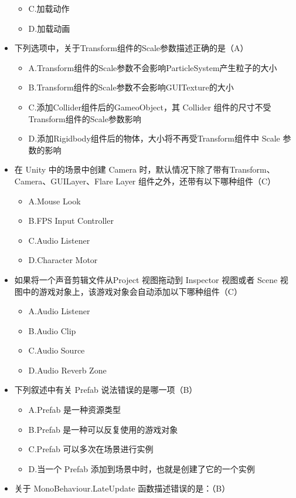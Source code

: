\documentclass[9pt, b5paper]{article}
\begin{document}
\begin{itemize}
\begin{itemize}
\item C.加载动作
\item D.加载动画
\end{itemize}
\item 下列选项中，关于Transform组件的Scale参数描述正确的是（A）
\begin{itemize}
\item A.Transform组件的Scale参数不会影响ParticleSystem产生粒子的大小
\item B.Transform组件的Scale参数不会影响GUITexture的大小
\item C.添加Collider组件后的GameoObject，其 Collider 组件的尺寸不受Transform组件的Scale参数影响
\item D.添加Rigidbody组件后的物体，大小将不再受Transform组件中 Scale 参数的影响
\end{itemize}
\item 在 Unity 中的场景中创建 Camera 时，默认情况下除了带有Transform、Camera、GUILayer、Flare Layer 组件之外，还带有以下哪种组件（C）
\begin{itemize}
\item A.Mouse Look
\item B.FPS Input Controller
\item C.Audio Listener
\item D.Character Motor
\end{itemize}
\item 如果将一个声音剪辑文件从Project 视图拖动到 Inspector 视图或者 Scene 视图中的游戏对象上，该游戏对象会自动添加以下哪种组件（C）
\begin{itemize}
\item A.Audio Listener
\item B.Audio Clip
\item C.Audio Source
\item D.Audio Reverb Zone
\end{itemize}
\item 下列叙述中有关 Prefab 说法错误的是哪一项（B）
\begin{itemize}
\item A.Prefab 是一种资源类型
\item B.Prefab 是一种可以反复使用的游戏对象
\item C.Prefab 可以多次在场景进行实例
\item D.当一个 Prefab 添加到场景中时，也就是创建了它的一个实例
\end{itemize}
\item 关于 MonoBehaviour.LateUpdate 函数描述错误的是：（B）
\begin{itemize}

\end{itemize}
\end{itemize}
\end{document}
